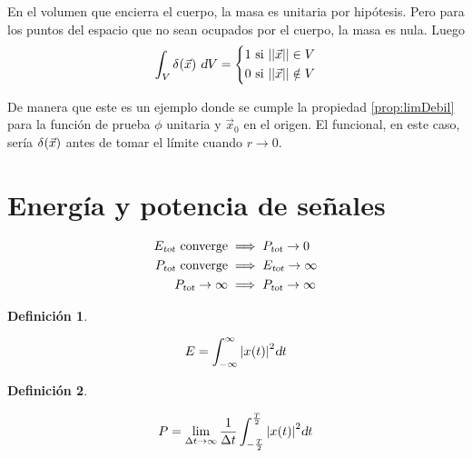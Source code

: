 \documentclass[a5paper,12pt,twoside]{book}
\newtheorem{defn}{{Definición}}[chapter]
\begin{document}
\begin{mdframed}[style=MyFrame2]
    En el volumen que encierra el cuerpo, la masa es unitaria por hipótesis. Pero para los puntos del espacio que no sean ocupados por el cuerpo, la masa es nula. Luego
    \begin{equation*}
        \int_V \fx[\delta]{\Vec{x}} \, \dif V =
        \left\{
        \begin{aligned}
            1 \text{ si } \nnorm{\Vec{x}} \in V
            \\
            0 \text{ si } \nnorm{\Vec{x}} \notin V
        \end{aligned}
        \right.
    \end{equation*}

    De manera que este es un ejemplo donde se cumple la propiedad \ref{prop:limDebil} para la función de prueba $\phi$ unitaria y $\Vec{x}_0$ en el origen. El funcional, en este caso, sería $\fx[\delta]{\Vec{x}}$ antes de tomar el límite cuando $r \to 0$.
\end{mdframed}


\section{Energía y potencia de señales}

\begin{align*}
        \sub{E}{tot} \text{ converge} & \implies \sub{P}{tot} \to 0
        \\
        \sub{P}{tot} \text{ converge} & \implies \sub{E}{tot} \to \infty
        \\
        \sub{P}{tot} \to \infty & \implies \sub{P}{tot} \to \infty
    \end{align*}

\begin{mdframed}[style=MyFrame1]
    \begin{defn}
    \end{defn}
    \begin{equation*}
        E = \int_{-\infty}^{\infty} \norm{\fx[x]{t}}^2 \dif t
    \end{equation*}
\end{mdframed}

\begin{mdframed}[style=MyFrame1]
    \begin{defn}
    \end{defn}
    \begin{equation*}
        P = \lim_{\Delta t \to \infty} \frac{1}{\Delta t} \int_{-\frac{T}{2}}^{\frac{T}{2}} \norm{\fx[x]{t}}^2 \dif t
    \end{equation*}
\end{mdframed}
\end{document}
